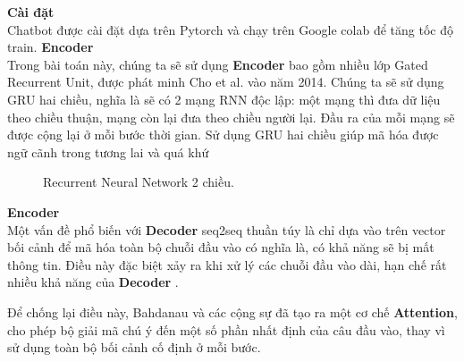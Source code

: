 \large\textbf{Cài đặt} \\[0.2em]
Chatbot được cài đặt dựa trên Pytorch và chạy trên Google colab để tăng tốc độ train.
\large\textbf{Encoder} \\[0.2em]
 Trong bài toán này, chúng ta sẽ sử dụng \textbf{Encoder} bao gồm nhiều lớp Gated Recurrent Unit, được phát minh Cho et
al. vào năm 2014. Chúng ta sẽ sử dụng GRU hai chiều, nghĩa là sẽ có 2 mạng RNN độc lập: một mạng thì đưa dữ liệu theo
chiều thuận, mạng còn lại đưa theo chiều người lại. Đầu ra của mỗi mạng sẽ được cộng lại ở mỗi bước thời gian. Sử
dụng GRU hai chiều giúp mã hóa được ngữ cãnh trong tương lai và quá khứ
\begin{figure}[!htb]
    \caption{\label{fig:rnn-bidirectional} Recurrent Neural Network 2 chiều.}
\end{figure}

\large\textbf{Encoder} \\[0.2em]
Một vấn đề phổ biến với \textbf{Decoder} seq2seq thuần túy là chỉ dựa vào trên vector bối cảnh để mã hóa
toàn bộ chuỗi đầu vào có nghĩa là, có khả năng sẽ bị mất thông tin. Điều này đặc biệt xảy ra khi xử lý các chuỗi đầu
vào dài, hạn chế rất nhiều khả năng của \textbf{Decoder} .

Để chống lại điều này, Bahdanau và các cộng sự  đã tạo ra một cơ chế \textbf{Attention}, cho phép bộ giải mã chú ý đến
một số phần nhất định của câu đầu vào, thay vì sử dụng toàn bộ bối cảnh cố định ở mỗi bước.

